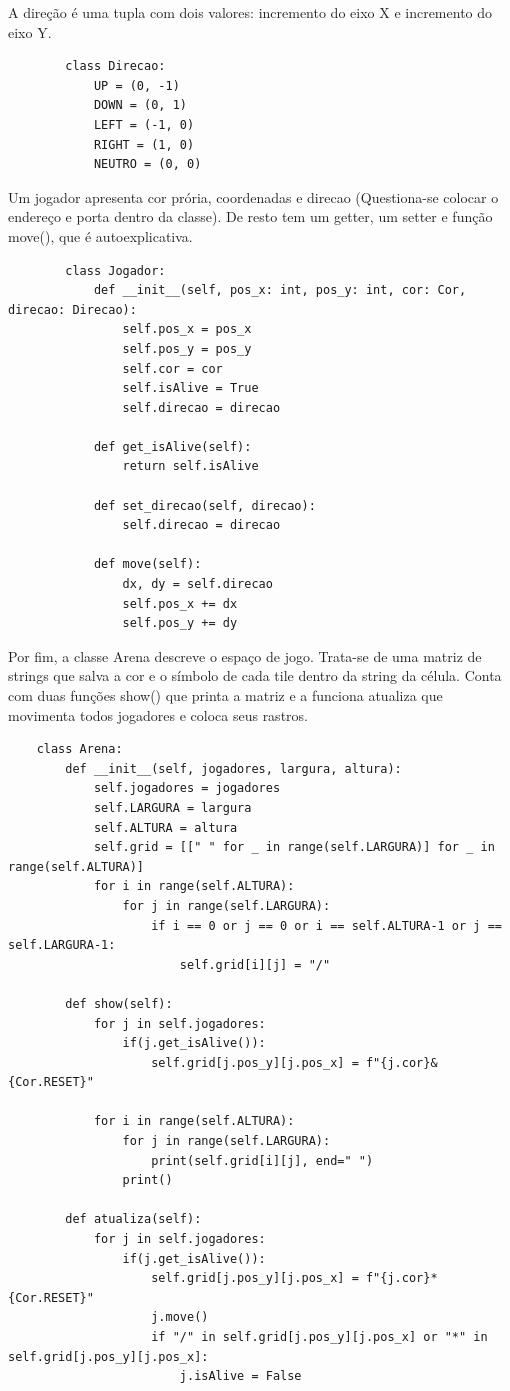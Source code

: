 \documentclass{cisXXX} %
\begin{document}
    A direção é uma tupla com dois valores: incremento do eixo X e incremento do eixo Y.
    \begin{lstlisting}
        class Direcao:
            UP = (0, -1)
            DOWN = (0, 1)
            LEFT = (-1, 0)
            RIGHT = (1, 0)
            NEUTRO = (0, 0)
    \end{lstlisting}

    Um jogador apresenta cor prória, coordenadas e direcao (Questiona-se colocar o endereço e porta dentro da classe).
    De resto tem um getter, um setter e função move(), que é autoexplicativa.
    \begin{lstlisting}
        class Jogador:
            def __init__(self, pos_x: int, pos_y: int, cor: Cor, direcao: Direcao):
                self.pos_x = pos_x
                self.pos_y = pos_y
                self.cor = cor
                self.isAlive = True
                self.direcao = direcao
        
            def get_isAlive(self):
                return self.isAlive
        
            def set_direcao(self, direcao):
                self.direcao = direcao
        
            def move(self):
                dx, dy = self.direcao
                self.pos_x += dx
                self.pos_y += dy
    \end{lstlisting}

    Por fim, a classe Arena descreve o espaço de jogo. Trata-se de uma matriz de strings que salva a cor e o símbolo de cada tile dentro da string da célula. Conta com duas funções show() que printa a matriz e a funciona atualiza que movimenta todos jogadores e coloca seus rastros.
    \begin{lstlisting}
    class Arena:
        def __init__(self, jogadores, largura, altura):
            self.jogadores = jogadores
            self.LARGURA = largura
            self.ALTURA = altura
            self.grid = [[" " for _ in range(self.LARGURA)] for _ in range(self.ALTURA)]
            for i in range(self.ALTURA):
                for j in range(self.LARGURA):
                    if i == 0 or j == 0 or i == self.ALTURA-1 or j == self.LARGURA-1:
                        self.grid[i][j] = "/"
    
        def show(self):
            for j in self.jogadores:
                if(j.get_isAlive()):
                    self.grid[j.pos_y][j.pos_x] = f"{j.cor}&{Cor.RESET}"
    
            for i in range(self.ALTURA):
                for j in range(self.LARGURA):
                    print(self.grid[i][j], end=" ")
                print()
    
        def atualiza(self):
            for j in self.jogadores:
                if(j.get_isAlive()):
                    self.grid[j.pos_y][j.pos_x] = f"{j.cor}*{Cor.RESET}"
                    j.move()
                    if "/" in self.grid[j.pos_y][j.pos_x] or "*" in self.grid[j.pos_y][j.pos_x]:
                        j.isAlive = False
    \end{lstlisting}
    
\end{document}
